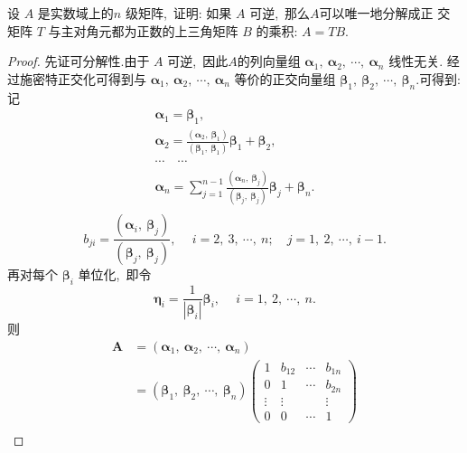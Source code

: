 \newpage
\begin{problem}
	设 $ A $ 是实数域上的$  n $ 级矩阵,\  证明: 如果 $ A $ 可逆,\  那么$  A  $可以唯一地分解成正 交矩阵  $T$  与主对角元都为正数的上三角矩阵 $ B $ 的乘积: $ A=T B.$
\end{problem}
\begin{proof}
	先证可分解性.由于 $ A $ 可逆,\  因此$  A  $的列向量组 $ \boldsymbol{\alpha}_{1},\  \boldsymbol{\alpha}_{2},\  \cdots,\  \boldsymbol{\alpha}_{n} $ 线性无关. 经过施密特正交化可得到与 $ \boldsymbol{\alpha}_{1},\  \boldsymbol{\alpha}_{2},\  \cdots,\  \boldsymbol{\alpha}_{n} $ 等价的正交向量组  $\boldsymbol{\beta}_{1},\  \boldsymbol{\beta}_{2},\  \cdots,\  \boldsymbol{\beta}_{n}.$可得到:
	记
	$$\begin{array}{l}
		\boldsymbol{\alpha}_{1}=\boldsymbol{\beta}_{1},\  \\
		\boldsymbol{\alpha}_{2}=\frac{\left(\boldsymbol{\alpha}_{2},\  \boldsymbol{\beta}_{1}\right)}{\left(\boldsymbol{\beta}_{1},\  \boldsymbol{\beta}_{1}\right)} \boldsymbol{\beta}_{1}+\boldsymbol{\beta}_{2},\  \\
		\cdots \quad \cdots \\
		\boldsymbol{\alpha}_{n}=\sum_{j=1}^{n-1} \frac{\left(\boldsymbol{\alpha}_{n},\  \boldsymbol{\beta}_{j}\right)}{\left(\boldsymbol{\beta}_{j},\  \boldsymbol{\beta}_{j}\right)} \boldsymbol{\beta}_{j}+\boldsymbol{\beta}_{n} . \\
	\end{array}$$
	$$b_{j i}=\frac{\left(\boldsymbol{\alpha}_{i},\  \boldsymbol{\beta}_{j}\right)}{\left(\boldsymbol{\beta}_{j},\  \boldsymbol{\beta}_{j}\right)},\  \quad i=2,\ 3,\  \cdots,\  n ; \quad j=1,\ 2,\  \cdots,\  i-1 .$$
	再对每个  $\boldsymbol{\beta}_{i} $ 单位化,\  即令
	$$\boldsymbol{\eta}_{i}=\frac{1}{\left|\boldsymbol{\beta}_{i}\right|} \boldsymbol{\beta}_{i},\  \quad i=1,\ 2,\  \cdots,\  n .$$
	则
	$$
	\begin{aligned}
		\boldsymbol{A}&=\left(\boldsymbol{\alpha}_{1},\  \boldsymbol{\alpha}_{2},\  \cdots,\  \boldsymbol{\alpha}_{n}\right)\\
		&=\left(\boldsymbol{\beta}_{1},\  \boldsymbol{\beta}_{2},\  \cdots,\  \boldsymbol{\beta}_{n}\right)\left(\begin{array}{cccc}
			1 & b_{12} & \cdots & b_{1 n} \\
			0 & 1 & \cdots & b_{2 n} \\
			\vdots & \vdots & & \vdots \\
			0 & 0 & \cdots & 1
		\end{array}\right) \\

\end{aligned}$$
\end{proof}
